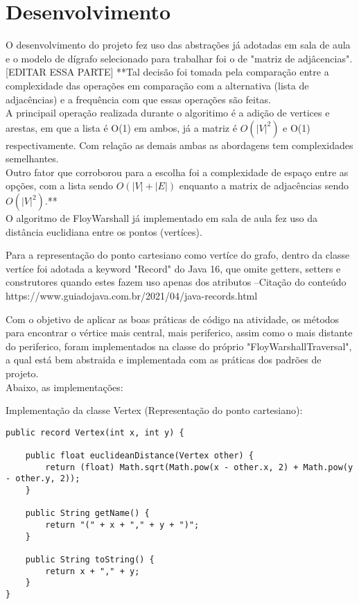 \documentclass[a4paper, 12pt]{article}
\begin{document}
\newpage
\section{Desenvolvimento}

O desenvolvimento do projeto fez uso das abstrações já adotadas em sala de aula e o modelo de dígrafo selecionado para trabalhar foi o de "matriz de adjâcencias".\\

[EDITAR ESSA PARTE]
**Tal decisão foi tomada pela comparação entre a complexidade das operações em comparação com a alternativa (lista de adjacências) e a frequência com que essas operações são feitas.\\
A principail operação realizada durante o algoritimo é a adição de vertices e arestas, em que a lista é O(1) em ambos, já a matriz é $O(|V|^2)$ e O(1) respectivamente. Com relação as demais ambas as abordagens tem complexidades semelhantes.\\
Outro fator que corroborou para a escolha foi a complexidade de espaço entre as opções, com a lista sendo $O(|V|+|E|)$ enquanto a matrix de adjacências sendo $O(|V|^2)$.**\\

O algoritmo de FloyWarshall já implementado em sala de aula fez uso da distância euclidiana entre os pontos (vertíces).

Para a representação do ponto cartesiano como vertíce do grafo, dentro da classe vertíce foi adotada a keyword "Record" do Java 16, que omite getters, setters e construtores quando estes fazem uso apenas dos atributos
--Citação do conteúdo https://www.guiadojava.com.br/2021/04/java-records.html

Com o objetivo de aplicar as boas práticas de código na atividade, os métodos para encontrar o vértice mais central, mais periferico, assim como o mais distante do periferico, foram implementados na classe do próprio "FloyWarshallTraversal", a qual está bem abstraida e implementada com as práticas dos padrões de projeto.\\

Abaixo, as implementações:

Implementação da classe Vertex (Representação do ponto cartesiano):

\begin{verbatim}
public record Vertex(int x, int y) {

    public float euclideanDistance(Vertex other) {
        return (float) Math.sqrt(Math.pow(x - other.x, 2) + Math.pow(y - other.y, 2));
    }

    public String getName() {
        return "(" + x + "," + y + ")";
    }

    public String toString() {
        return x + "," + y;
    }
}

\end{verbatim}
\end{document}
